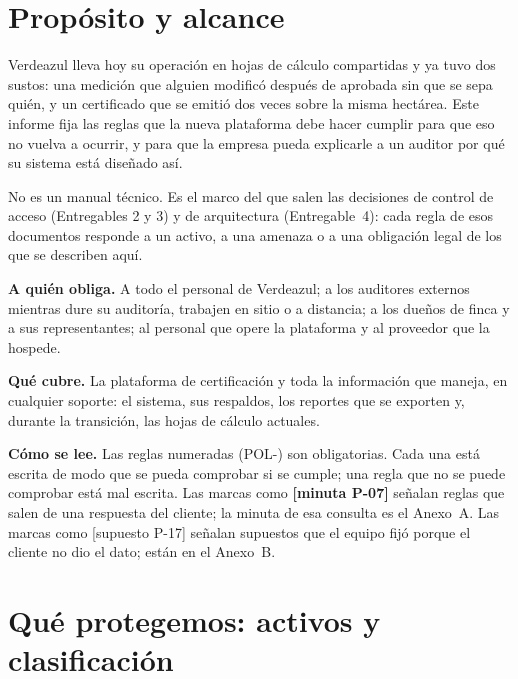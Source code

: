 \documentclass[11pt,letterpaper]{article}
\newcommand{\resp}[1]{\textrm{\footnotesize\bfseries [minuta #1]}}
\newcommand{\supu}[1]{\textrm{\footnotesize [supuesto #1]}}
\begin{document}
\tableofcontents
\newpage
{}

\section{Propósito y alcance}

Verdeazul lleva hoy su operación en hojas de cálculo compartidas y ya tuvo dos sustos: una medición
que alguien modificó después de aprobada sin que se sepa quién, y un certificado que se emitió dos
veces sobre la misma hectárea. Este informe fija las reglas que la nueva plataforma debe hacer cumplir
para que eso no vuelva a ocurrir, y para que la empresa pueda explicarle a un auditor por qué su sistema
está diseñado así.

No es un manual técnico. Es el marco del que salen las decisiones de control de acceso (Entregables 2
y 3) y de arquitectura (Entregable~4): cada regla de esos documentos responde a un activo, a una amenaza
o a una obligación legal de los que se describen aquí.

\textbf{A quién obliga.} A todo el personal de Verdeazul; a los auditores externos mientras dure su
auditoría, trabajen en sitio o a distancia; a los dueños de finca y a sus representantes; al personal
que opere la plataforma y al proveedor que la hospede.

\textbf{Qué cubre.} La plataforma de certificación y toda la información que maneja, en cualquier soporte:
el sistema, sus respaldos, los reportes que se exporten y, durante la transición, las hojas de cálculo
actuales.

\textbf{Cómo se lee.} Las reglas numeradas (\textrm{POL-}) son obligatorias. Cada una está escrita de
modo que se pueda comprobar si se cumple; una regla que no se puede comprobar está mal escrita. Las marcas como
\resp{P-07} señalan reglas que salen de una respuesta del cliente; la minuta de esa consulta es el
Anexo~A. Las marcas como \supu{P-17} señalan supuestos que el equipo fijó porque el cliente no dio el
dato; están en el Anexo~B.

\section{Qué protegemos: activos y clasificación}
\label{sec:activos}
\end{document}
